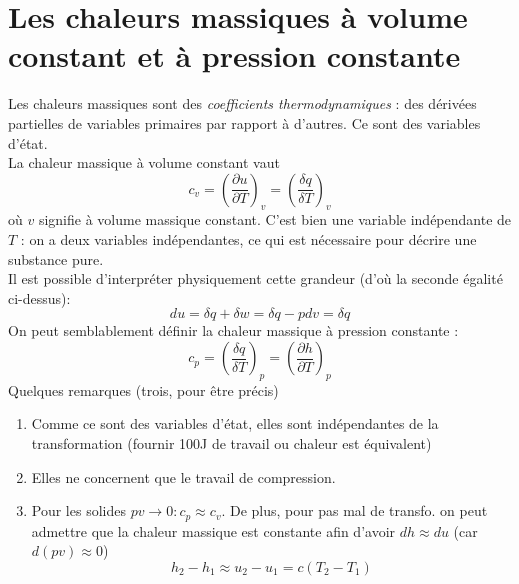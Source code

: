 \section{Les chaleurs massiques à volume constant et à pression 
constante}
Les chaleurs massiques sont des \textit{coefficients thermodynamiques} : 
des dérivées partielles de variables primaires par rapport à d'autres. 
Ce sont des variables d'état. \\
La chaleur massique à volume constant vaut
\begin{equation}
c_v = \left(\frac{\partial u}{\partial T}\right)_v = \left(\frac{\delta 
q}{\delta T}\right)_v
\end{equation}
où $v$ signifie à volume massique constant. C'est bien une variable 
indépendante de $T$ : on a deux variables indépendantes, ce qui est 
nécessaire pour décrire une substance pure.\\
Il est possible d’interpréter physiquement cette grandeur (d'où la 
seconde égalité ci-dessus):
\begin{equation}
du = \delta q + \delta w = \delta q - pdv = \delta q
\end{equation}
On peut semblablement définir la chaleur massique à pression constante :
\begin{equation}
c_p = \left(\frac{\delta q}{\delta T}\right)_p = \left(\frac{\partial h}{
\partial T}\right)_p
\end{equation}
Quelques remarques (trois, pour être précis)
\begin{enumerate}
\item Comme ce sont des variables d'état, elles sont indépendantes de 
la transformation (fournir 100J de travail ou chaleur est équivalent)
\item Elles ne concernent que le travail de compression.
\item Pour les solides $pv \rightarrow 0 : c_p\approx c_v$. De plus, 
pour pas mal de transfo. on peut admettre que la chaleur massique est 
constante afin d'avoir $dh\approx du$ (car $d(pv)\approx 0$)
\begin{equation}
h_2-h_1\approx u_2-u_1 = c(T_2-T_1)
\end{equation}
\end{enumerate}


